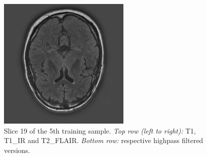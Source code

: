 \documentclass[varwidth=true, border=10pt, convert={size=640x}]{standalone}
\begin{document}
\begin{figure}
\begin{minipage}{.32\textwidth}
  \end{minipage}
  \begin{minipage}{.32\textwidth}
 \includegraphics[width=.99\linewidth]{./images/t2-flair-gs.png}
  \end{minipage}
  \caption{Slice 19 of the 5th training sample. \emph{Top row (left to right):} T1, T1\_IR and T2\_FLAIR. \emph{Bottom row:} respective highpass filtered versions.}
  \label{data}
\end{figure}
\end{document}
